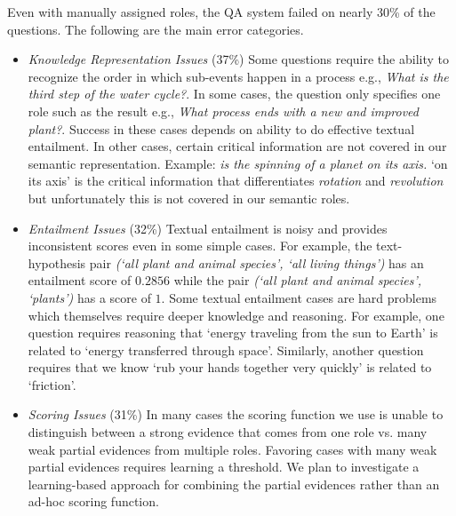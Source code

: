 Even with manually assigned roles, the QA system failed on nearly 30\% of the questions. The following are the main error categories.
\begin{itemize}[noitemsep,nolistsep]
\item {\em Knowledge Representation Issues} (37\%)
Some questions require the ability to recognize the order in which sub-events happen in a process e.g., {\em What is the third step of the water cycle?}.
In some cases, the question only specifies one role such as the result e.g., {\em What process ends with a new and improved plant?}. Success in these cases depends on ability to do effective textual entailment. 
In other cases, certain critical information are not covered in our semantic representation. Example: {\em \underline{\hspace{1cm}} is the spinning of a planet on its axis.} `on its axis' is the critical information that differentiates {\em rotation} and {\em revolution} but unfortunately this is not covered in our semantic roles.
\item {\em Entailment Issues} (32\%)
Textual entailment is noisy and provides inconsistent scores even in some simple cases. For example, the text-hypothesis pair {\em(`all plant and animal species', `all living things')} has an entailment score of $0.2856$ while the pair {\em(`all plant and animal species', `plants')} has a score of $1$.
Some textual entailment cases are hard problems which themselves require deeper knowledge and reasoning. For example, one question requires reasoning that `energy traveling from the sun to Earth' is related to `energy transferred through space'. Similarly, another question requires that we know `rub your hands together very quickly' is related to `friction'.
\item {\em Scoring Issues} (31\%) 
In many cases the scoring function we use is unable to distinguish between a strong evidence that comes from one role vs. many weak partial evidences from multiple roles. Favoring cases with many weak partial evidences requires learning a threshold.  We plan to investigate a learning-based approach for combining the partial evidences rather than an ad-hoc scoring function. 
\end{itemize}
